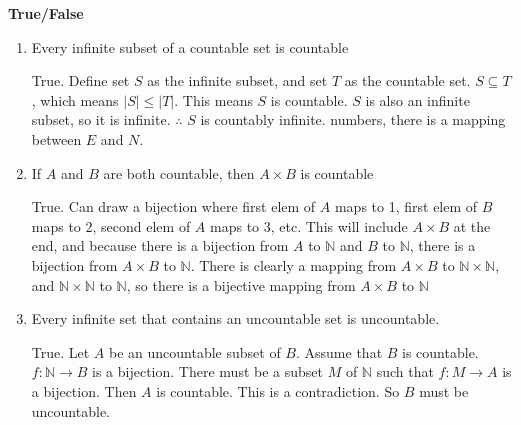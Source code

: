 \question \textbf{True/False} 
\begin{enumerate}[label=(\alph*)]
\item Every infinite subset of a countable set is countable
\begin{solution}
True. Define set $S$ as the infinite subset, and set $T$ as the countable set. $S \subseteq T$, which means $|S| \leq |T|$. This means $S$ is countable. $S$ is also an infinite subset, so it is infinite. $\therefore$ $S$ is countably infinite.
numbers, there is a mapping between $E$ and $N$.
\end{solution}

\item If $A$ and $B$ are both countable, then $A \times B$ is countable
\begin{solution}
True. Can draw a bijection where first elem of $A$ maps to 1, first elem 
of $B$ maps to 2, second elem of $A$ maps to 3, etc. This will include $A \times B$
at the end, and because there is a bijection from $A$ to $\mathbb{N}$ and $B$ to $\mathbb{N}$, there is a bijection from $A \times B$ to $\mathbb{N}$. There is clearly a mapping from 
$A \times B$ to $\mathbb{N} \times \mathbb{N}$, and $\mathbb{N} \times \mathbb{N}$ to $\mathbb{N}$, so there is a 
bijective mapping from $A \times B$ to $\mathbb{N}$
\end{solution}

\item Every infinite set that contains an uncountable set is uncountable. 
\begin{solution}
True.
Let $A$ be an uncountable subset of $B$.
Assume that $B$ is countable.
$f:\mathbb{N} \rightarrow B$ is a bijection.
There must be a subset $M$ of $\mathbb{N}$ such that $f: M \rightarrow A$ is a bijection.
Then $A$ is countable.
This is a contradiction.
So $B$ must be uncountable.
\end{solution}
\end{enumerate}